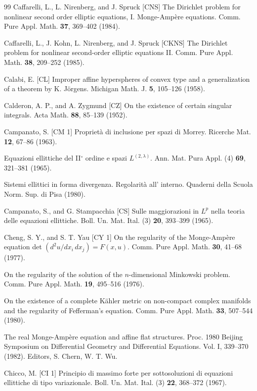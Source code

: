 \begin{thebibliography}{99}
Caffarelli, L., L. Nirenberg, and J. Spruck
[CNS] \quad The Dirichlet problem for nonlinear second order elliptic equations, I. Monge-Amp\`ere
equations. Comm. Pure Appl. Math. \textbf{37}, 369--402 (1984).

Caffarelli, L., J. Kohn, L. Nirenberg, and J. Spruck
[CKNS] \quad The Dirichlet problem for nonlinear second-order elliptic equations II. Comm. Pure Appl.
Math. \textbf{38}, 209--252 (1985).

Calabi, E.
[CL] \quad Improper affine hyperspheres of convex type and a generalization of a theorem by K.
J\"orgens. Michigan Math. J. \textbf{5}, 105--126 (1958).

Calderon, A. P., and A. Zygmund
[CZ] \quad On the existence of certain singular integrals. Acta Math. \textbf{88}, 85--139 (1952).

Campanato, S.
[CM 1] \quad Propriet\`a di inclusione per spazi di Morrey. Ricerche Mat. \textbf{12}, 67--86 (1963).

\quad Equazioni ellittiche del II$^\circ$ ordine e spazi $L^{(2,\lambda)}$. Ann. Mat. Pura Appl. (4) \textbf{69}, 321--381
(1965).

\quad Sistemi ellittici in forma divergenza. Regolarit\`a all' interno. Quaderni della Scuola Norm.
Sup. di Pisa (1980).

Campanato, S., and G. Stampacchia
[CS] \quad Sulle maggiorazioni in $L^p$ nella teoria delle equazioni ellittiche. Boll. Un. Mat. Ital. (3) \textbf{20},
393--399 (1965).

Cheng, S. Y., and S. T. Yau
[CY 1] \quad On the regularity of the Monge-Amp\`ere equation det $(d^2u/dx_i\,dx_j) = F(x, u)$. Comm. Pure
Appl. Math. \textbf{30}, 41--68 (1977).

\quad On the regularity of the solution of the $n$-dimensional Minkowski problem. Comm. Pure
Appl. Math. \textbf{19}, 495--516 (1976).

\quad On the existence of a complete K\"ahler metric on non-compact complex manifolds and the
regularity of Fefferman's equation. Comm. Pure Appl. Math. \textbf{33}, 507--544 (1980).

\quad The real Monge-Amp\`ere equation and affine flat structures. Proc. 1980 Beijing Symposium
on Differential Geometry and Differential Equations. Vol. I, 339--370 (1982). Editors,
S. Chern, W. T. Wu.

Chicco, M.
[CI 1] \quad Principio di massimo forte per sottosoluzioni di equazioni ellittiche di tipo variazionale.
Boll. Un. Mat. Ital. (3) \textbf{22}, 368--372 (1967).

\end{thebibliography}

